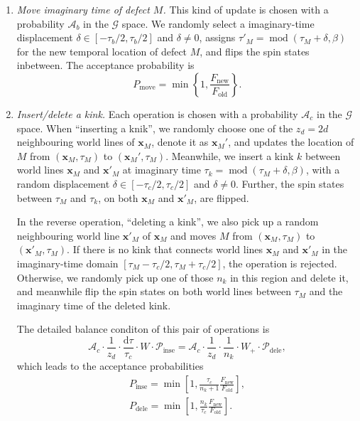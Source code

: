 \documentclass{article}
\DeclareMathOperator{\Mod}{mod}
\theoremstyle{plain} \newtheorem{thm}{Theorem}[section]
\theoremstyle{definition} \newtheorem{df}{Definition}[section]
\theoremstyle{definition} \newtheorem{eg}{Example}
\theoremstyle{remark} \newtheorem*{rmk}{Remark}
\begin{document}
\begin{enumerate}
  \item \textit{Move imaginary time of defect $M$.}
    This kind of update is chosen with a probability $\mathcal{A}_b$ in the $\mathcal{G}$ space. We randomly select a imaginary-time displacement $\delta \in [-\tau_b/2, \tau_b/2]$ and $\delta\ne 0$, assigns $\tau'_M = \Mod(\tau_M+\delta,\beta)$ for the new temporal location of defect $M$, and flips the spin states inbetween. The acceptance probability is
    \begin{equation}
      P_\text{move} = \min\left\{1, \frac{F_\text{new}}{F_\text{old}}\right\}.
    \end{equation}

  \item \textit{Insert/delete a kink.}
    Each operation is chosen with a probability $\mathcal{A}_c$ in the $\mathcal{G}$ space. When ``inserting a knik'', we randomly choose one of the $z_d = 2d$ neighbouring world lines of $\bm{x}_M$, denote it as $\bm{x}_M'$, and updates the location of $M$ from $(\bm{x}_M, \tau_M)$ to $(\bm{x}_M', \tau_M)$. Meanwhile, we insert a kink $k$ between world lines ${\mathbf x}_M$ and ${\mathbf x}'_M$ at imaginary time $\tau_k = \Mod(\tau_M+\delta,\beta)$, with a random displacement $\delta \in [-\tau_c/2, \tau_c/2]$ and $\delta\neq 0$. Further, the spin states between $\tau_M$ and $\tau_k$, on both ${\mathbf x}_M$ and ${\mathbf x}'_M$, are flipped.

    In the reverse operation, ``deleting a kink'', we also pick up a random neighbouring world line ${\mathbf x}'_M$ of $\mathbf{x}_M$ and moves $M$ from $({\mathbf x}_M, \tau_M)$ to $({\mathbf x}'_M, \tau_M)$. If there is no kink that connects world lines ${\mathbf x}_M$ and ${\mathbf x}'_M$ in the imaginary-time domain $[\tau_M-\tau_c/2, \tau_M+\tau_c/2]$, the operation is rejected. Otherwise, we randomly pick up one of those  $n_k$ in this region and delete it, and meanwhile flip the spin states on both world lines between $\tau_M$ and the imaginary time of the deleted kink.

    The detailed balance conditon of this pair of operations is
    \begin{equation}
      \mathcal{A}_c\cdot\frac{1}{z_d}\cdot\frac{\mathrm{d}\tau}{\tau_c}\cdot W\cdot \mathcal{P}_\text{inse} = \mathcal{A}_c\cdot\frac{1}{z_d}\cdot\frac{1}{n_k}\cdot W_+\cdot \mathcal{P}_\text{dele},
    \end{equation}
    which leads to the acceptance probabilities
    \begin{gather}
      P_\text{inse} = \min\left[1, \frac{\tau_c}{n_k+1}\frac{F_\text{new}}{F_\text{old}}\right],\\
      P_\text{dele} = \min\left[1, \frac{n_k}{\tau_c}\frac{F_\text{new}}{F_\text{old}}\right].
    \end{gather}
\end{enumerate}
\end{document}
